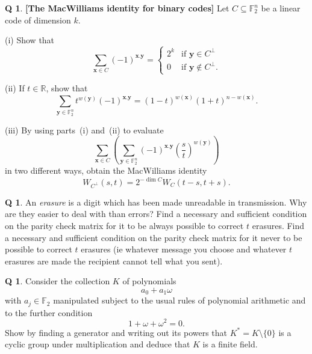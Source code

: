 \documentclass[12pt,a4paper]{article}
\theoremstyle{plain}
\theoremstyle{definition}
\newtheorem{question}[theorem]{Q}
\begin{document}
    \begin{question}{\bf[The MacWilliams identity for binary codes]}%
        \label{E;MacWilliams}\label{C3.9}
        Let $C\subseteq {\mathbb F}_{2}^{n}$ be a linear code
        of dimension $k$.

        (i) Show that
        \[\sum_{{\mathbf x}\in C}(-1)^{{\mathbf x}.{\mathbf y}}
        =\begin{cases}
             2^{k}&\text{if ${\mathbf y}\in C^{\perp}$}\\
             0&\text{if ${\mathbf y}\notin C^{\perp}$}.
        \end{cases}\]

        (ii) If $t\in{\mathbb R}$, show that
        \[\sum_{{\mathbf y}\in {\mathbb F}_{2}^{n}}t^{w({\mathbf y})}
        (-1)^{{\mathbf x}.{\mathbf y}}
        =(1-t)^{w({\mathbf x})}(1+t)^{n-w({\mathbf x})}.\]

        (iii) By using parts~(i) and~(ii) to evaluate
        \[\sum_{{\mathbf x}\in C}
        \left(\sum_{{\mathbf y}\in {\mathbb F}_{2}^{n}}
        (-1)^{{\mathbf x}.{\mathbf y}}\left(\frac{s}{t}\right)^{w({\mathbf y})}
        \right)\]
        in two different ways, obtain the MacWilliams identity
        \[W_{C^{\perp}}(s,t)=2^{-\dim C}W_{C}(t-s,t+s).\]
    \end{question}
    \begin{question}
        \label{C3.10}
        An \emph{erasure} is a digit which has
        been made unreadable in transmission. Why are they
        easier to deal with than errors? Find a necessary
        and sufficient condition on the parity check matrix
        for it to be always possible to correct
        $t$ erasures. Find a necessary
        and sufficient condition on the parity check matrix
        for it never to be possible to correct
        $t$ erasures (ie whatever message you choose
        and whatever $t$ erasures are made the recipient
        cannot tell what you sent).
    \end{question}
    \begin{question}
        \label{C3.11}
        Consider the collection $K$ of polynomials
        \[a_{0}+a_{1}\omega\]
        with $a_{j}\in{\mathbb F}_{2}$ manipulated
        subject to the usual rules of polynomial
        arithmetic and to the further condition
        \[1+\omega+\omega^{2}=0.\]
        Show by finding a generator and writing out its powers
        that
        $K^{*}=K\setminus\{0\}$ is a cyclic group
        under multiplication and deduce that
        $K$ is a finite field.

    \end{question}
\end{document}
